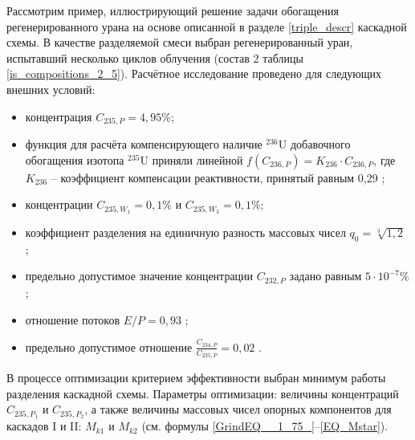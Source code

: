 Рассмотрим пример, иллюстрирующий решение задачи обогащения регенерированного урана на основе описанной в разделе \ref{triple_descr} каскадной схемы. В качестве разделяемой смеси выбран регенерированный уран, испытавший несколько циклов облучения (состав 2 таблицы \ref{is_compositions_2_5}). Расчётное исследование проведено для следующих внешних условий:

\begin{itemize}
    \item концентрация $C_{235,{P}} = {4,95\%}$; 
    \item функция для расчёта компенсирующего наличие $^{236}$U добавочного обогащения изотопа $^{235}$U приняли линейной $f(C_{236,P}) = {K_{236}\cdot{C_{236,{P}}}}$, где $K_{236}$ -- коэффициент компенсации реактивности, принятый равным 0,29 \cite{smirnovEvolutionIsotopicComposition2012};
    \item концентрации $C_{235,{W_1}} = 0,1\%$ и $C_{235,{W_3}} = 0,1\%$;
    \item коэффициент разделения на единичную разность массовых чисел $q_{0} = \sqrt[3]{1,2}$ \cite{smirnovEvolutionIsotopicComposition2012};
    \item предельно допустимое значение концентрации $C_{232,{P}}$ задано равным $5\cdot10^{-7} \%$;
    \item отношение потоков $E/P = 0,93$ \cite{smirnovObogashchenieRegenerirovannogoUrana2018};
    \item предельно допустимое отношение $\frac{C_{234,{P}}}{C_{235,{P}}} = 0,02$ \cite{smirnovObogashchenieRegenerirovannogoUrana2018}. 
\end{itemize}

В процессе оптимизации критерием эффективности выбран минимум работы разделения каскадной схемы. Параметры оптимизации: величины концентраций $C_{235,{P_1}}$ и $C_{235,{P_2}}$, а также величины массовых чисел опорных компонентов для каскадов I и II: $M_{k1}$ и $M_{k2}$ (см. формулы \ref{GrindEQ__1_75_}--\ref{EQ_Mstar}). 

